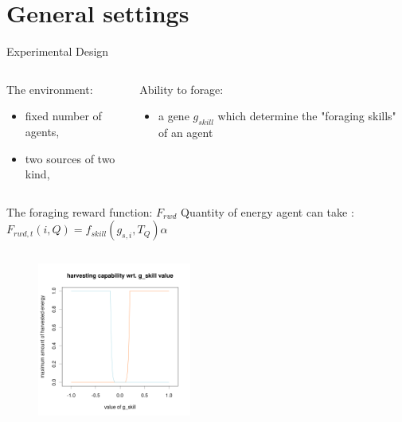 \documentclass[8pt, handout=show,notes=show]{beamer}
\begin{document}




\section{General settings}

\begin{frame}{Experimental Design}
	\begin{columns}[t]
			\begin{block}{The environment:}
				\begin{itemize}
					\item fixed number of agents,
					\item two sources of two kind,
				\end{itemize}
			\end{block}
			\begin{block}{Ability to forage:}
				\begin{itemize}
					\item a gene $g_{skill}$ which determine the "foraging skills" of an agent
				\end{itemize}
			\end{block}
	\end{columns}
	\begin{columns}
		\begin{block}{The foraging reward function: $F_{rwd}$}
			Quantity of energy agent can take :
			$F_{rwd,t}(i,Q) = f_{skill}\left(g_{s,i},T_Q\right)\alpha$%
		\end{block}
	\end{columns}
	\begin{figure}
		\includegraphics[width=0.45\textwidth]{../images/sparsityEffect/f_skill}
	\end{figure}
\end{frame}
 
\end{document}
